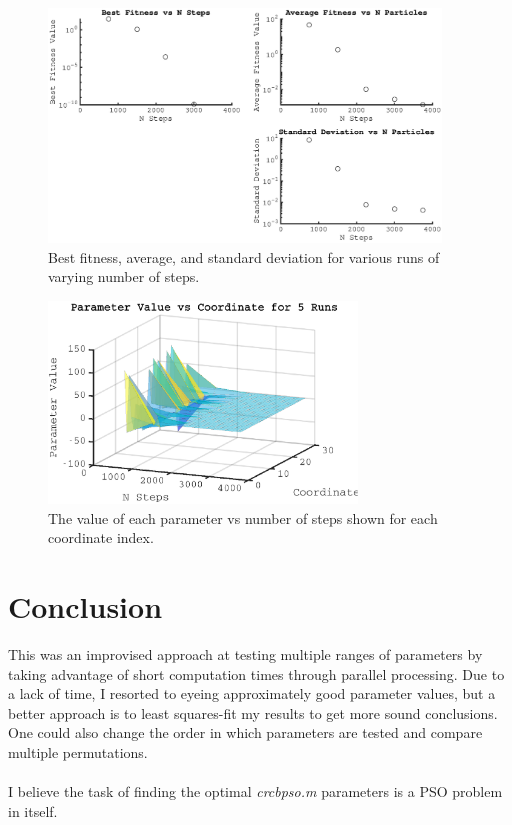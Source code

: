 \documentclass{article}
\begin{document}
\begin{figure}[h!]
\centering
\includegraphics[width=0.93\textwidth]{steps_2d}
\caption{Best fitness, average, and standard deviation for various runs of varying number of steps.}
\label{fig:steps_2d}
\end{figure}

\begin{figure}[h!]
\centering
\includegraphics[width=0.73\textwidth]{steps_3d}
\caption{The value of each parameter vs number of steps shown for each coordinate index.}
\label{fig:steps_3d}
\end{figure}

\section{Conclusion}

This was an improvised approach at testing multiple ranges of parameters by taking advantage of short computation times through parallel processing.
Due to a lack of time, I resorted to eyeing approximately good parameter values, but a better approach is to least squares-fit my results to get more sound conclusions.
One could also change the order in which parameters are tested and compare multiple permutations. \\
\\
I believe the task of finding the optimal \textit{crcbpso.m} parameters is a PSO problem in itself. \\



\end{document}

